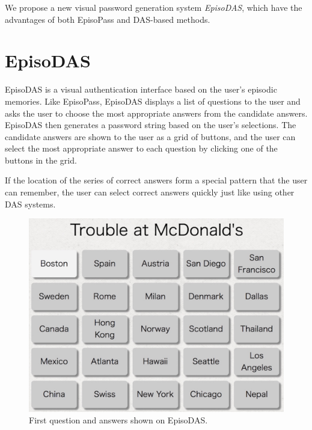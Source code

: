 \documentclass[sigconf]{acmart}
\begin{document}
We propose a new visual password generation system \textit{EpisoDAS},
which have the advantages of both EpisoPass and DAS-based methods.

\section{EpisoDAS}

EpisoDAS is a visual authentication interface
based on the user's episodic memories.
Like EpisoPass,
EpisoDAS displays a list of questions to the user and
asks the user to choose the most appropriate answers
from the candidate answers.
EpisoDAS then generates a password string based on the user's selections.
%
% 
%
The candidate answers are shown to the user as a grid of buttons,
and the user can select the most appropriate answer to each question
by clicking one of the buttons in the grid.

If the location of the series of correct answers form a special
pattern that the user can remember, the user can select
correct answers quickly just like using other DAS systems.


\begin{figure}[H]
  \includegraphics[width=12cm,bb=0 0 1398 1060]{figures/EpisoDAS1.jpg}
  \caption{First question and answers shown on EpisoDAS.}
  \label{EpisoDAS1}
\end{figure}
\end{document}
